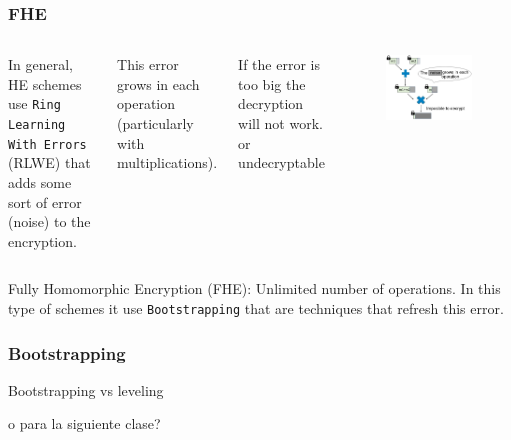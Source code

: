\documentclass[10pt,handout]{beamer}
\begin{document}


\begin{frame}
    \frametitle{FHE}
  \begin{columns}
      In general, HE schemes use \texttt{Ring Learning With Errors} (RLWE) that  adds some sort of error (noise) to the encryption.

\vspace{0.3cm}
    This error grows in each operation (particularly with multiplications).

\vspace{0.3cm}
      If the error is too big the decryption will not work. or undecryptable
        \begin{figure}[h!]
            \centering
            \includegraphics[scale=0.2]{multNoise.jpg}
        \end{figure}

\end{columns}    Fully Homomorphic Encryption (FHE): Unlimited number of operations. In this type of schemes
    it use \texttt{Bootstrapping} that are techniques that refresh this error.


\end{frame}


\begin{frame}
\frametitle{Bootstrapping}

Bootstrapping vs leveling

o para la siguiente clase?
\end{frame}
\end{document}
